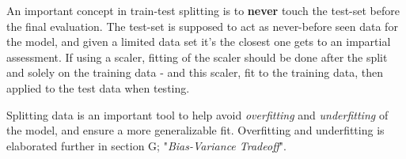 An important concept in train-test splitting is to \textbf{never} touch the test-set before the final evaluation. The test-set is supposed to act as never-before seen data for the model, and given a limited data set it's the closest one gets to an impartial assessment. 
If using a scaler, fitting of the scaler should be done after the split and solely on the training data - and this scaler, fit to the training data, then applied to the test data when testing. 

Splitting data is an important tool to help avoid \textit{overfitting} and \textit{underfitting} of the model, and ensure a more generalizable fit. Overfitting and underfitting is elaborated further in  section G; "\textit{Bias-Variance Tradeoff}".









